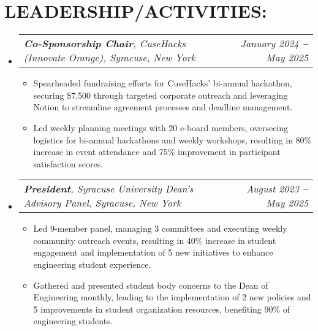 \documentclass[letterpaper,10pt]{article}
\makeatletter
\newcommand{\resumeItem}[1]{
  \item\small{
    {#1 \vspace{-2pt}}
  }
}
\newcommand{\resumeSubheading}[2]{
  \vspace{-2pt}\item
    \begin{tabular*}{0.97\textwidth}[t]{l@{\extracolsep{\fill}}r}
      \textit{\small{#1}} & \textit{\small #2} \\
    \end{tabular*}\vspace{-7pt}
}
\newcommand{\resumeSubHeadingListStart}{\begin{itemize}[leftmargin=0.15in, label={}]}
\newcommand{\resumeSubHeadingListEnd}{\end{itemize}\vspace{-10pt}}
\newcommand{\resumeItemListStart}{\begin{itemize}}
\newcommand{\resumeItemListEnd}{\end{itemize}\vspace{-5pt}}
\makeatother
\begin{document}
\section{\textbf{LEADERSHIP/ACTIVITIES:}}
  \resumeSubHeadingListStart
    \resumeSubheading
    {\textbf{Co-Sponsorship Chair}, CuseHacks (Innovate Orange), Syracuse, New York }{January 2024 \textbf{--} May 2025}{}{}
        \resumeItemListStart
            \resumeItem{Spearheaded fundraising efforts for CuseHacks' bi-annual hackathon, securing \$7,500 through targeted corporate outreach and leveraging Notion to streamline agreement processes and deadline management.}
            \resumeItem{Led weekly planning meetings with 20 e-board members, overseeing logistics for bi-annual hackathons and weekly workshops, resulting in 80\% increase in event attendance and 75\% improvement in participant satisfaction scores.}
        \resumeItemListEnd

    \resumeSubheading
    {\textbf{President}, Syracuse University Dean's Advisory Panel, Syracuse, New York}{August 2023 \textbf{--} May 2025}{}{}
        \resumeItemListStart
            \resumeItem{Led 9-member panel, managing 3 committees and executing weekly community outreach events, resulting in 40\% increase in student engagement and implementation of 5 new initiatives to enhance engineering student experience.}
            \resumeItem{Gathered and presented student body concerns to the Dean of Engineering monthly, leading to the implementation of 2 new policies and 5 improvements in student organization resources, benefiting 90\% of engineering students.}
        \resumeItemListEnd

  \resumeSubHeadingListEnd
\end{document}
